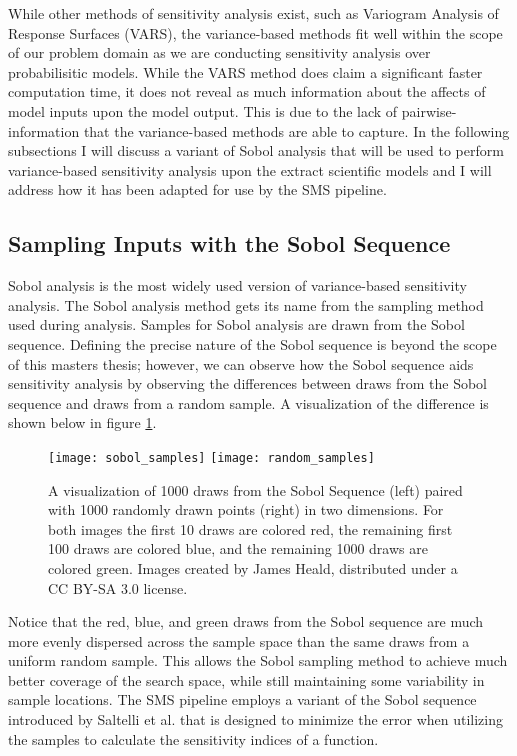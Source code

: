 While other methods of sensitivity analysis exist, such as Variogram Analysis of Response Surfaces (VARS), the variance-based methods fit well within the scope of our problem domain as we are conducting sensitivity analysis over probabilisitic models.
While the VARS method does claim a significant faster computation time, it does not reveal as much information about the affects of model inputs upon the model output.
This is due to the lack of pairwise-information that the variance-based methods are able to capture.
In the following subsections I will discuss a variant of Sobol analysis \cite{sobol2001globalSA} that will be used to perform variance-based sensitivity analysis upon the extract scientific models and I will address how it has been adapted for use by the SMS pipeline.

\subsection{Sampling Inputs with the Sobol Sequence\label{sec:sobol_seq}}
Sobol analysis is the most widely used version of variance-based sensitivity analysis. The Sobol analysis method gets its name from the sampling method used during analysis. Samples for Sobol analysis are drawn from the Sobol sequence. Defining the precise nature of the Sobol sequence is beyond the scope of this masters thesis; however, we can observe how the Sobol sequence aids sensitivity analysis by observing the differences between draws from the Sobol sequence and draws from a random sample. A visualization of the difference is shown below in figure \ref{sobol_seq_vis}.

\FloatBarrier
\begin{figure}[!htbp]
    \label{sobol_seq_vis}
    \centering
    \texttt{[image: sobol\_samples]}\hfill
    \texttt{[image: random\_samples]}
    \caption[Sobol Sequence Visualization]{A visualization of 1000 draws from the Sobol Sequence (left) paired with 1000 randomly drawn points (right) in two dimensions. For both images the first 10 draws are colored red, the remaining first 100 draws are colored blue, and the remaining 1000 draws are colored green. Images created by James Heald, distributed under a CC BY-SA 3.0 license.}
\end{figure}
\FloatBarrier

Notice that the red, blue, and green draws from the Sobol sequence are much more evenly dispersed across the sample space than the same draws from a uniform random sample. This allows the Sobol sampling method to achieve much better coverage of the search space, while still maintaining some variability in sample locations. The SMS pipeline employs a variant of the Sobol sequence introduced by Saltelli et al. \cite{saltelli2002ImprovedSobolSeq} that is designed to minimize the error when utilizing the samples to calculate the sensitivity indices of a function.

